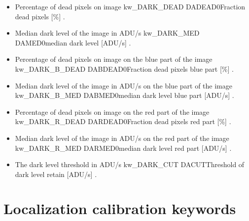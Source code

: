 \begin{itemize}

\item {}
{Percentage of dead pixels on image}
{kw\_DARK\_DEAD}
{DADEAD}{0}{Fraction dead pixels [\%]}
{\calDARK}{\spirouKeywords}{\calDARK.\progMAIN}

\item {}
{Median dark level of the image in ADU/s}
{kw\_DARK\_MED}
{DAMED}{0}{median dark level [ADU/s]}
{\calDARK}{\spirouKeywords}{\calDARK.\progMAIN}

\item {}
{Percentage of dead pixels on image on the blue part of the image}
{kw\_DARK\_B\_DEAD}
{DABDEAD}{0}{Fraction dead pixels blue part [\%]}
{\calDARK}{\spirouKeywords}{\calDARK.\progMAIN}

\item {}
{Median dark level of the image in ADU/s on the blue part of the image}
{kw\_DARK\_B\_MED}
{DABMED}{0}{median dark level blue part [ADU/s]}
{\calDARK}{\spirouKeywords}{\calDARK.\progMAIN}

\item {}
{Percentage of dead pixels on image on the red part of the image}
{kw\_DARK\_R\_DEAD}
{DARDEAD}{0}{Fraction dead pixels red part [\%]}
{\calDARK}{\spirouKeywords}{\calDARK.\progMAIN}

\item {}
{Median dark level of the image in ADU/s on the red part of the image}
{kw\_DARK\_R\_MED}
{DARMED}{0}{median dark level red part [ADU/s]}
{\calDARK}{\spirouKeywords}{\calDARK.\progMAIN}
\item {}
{The dark level threshold in ADU/s}
{kw\_DARK\_CUT}
{DACUT}{}{Threshold of dark level retain [ADU/s]}
{\calDARK}{\spirouKeywords}{\calDARK.\progMAIN}

\end{itemize}

\clearpage
\newpage
\section{Localization calibration keywords}
\label{ch:output_keywords:localization}

